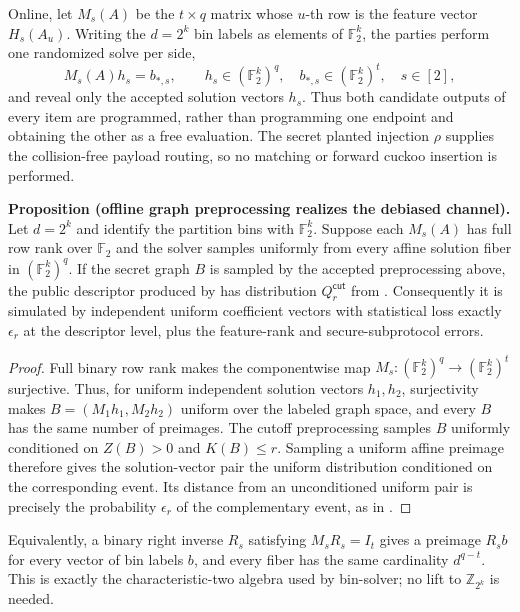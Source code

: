 Online, let $M_s(A)$ be the $t\times q$ matrix whose $u$-th row is the
feature vector $H_s(A_u)$.  Writing the $d=2^k$ bin labels as elements of
$\mathbb F_2^k$, the parties perform one randomized solve per side,
\begin{equation}\label{eq:rev-cuckoo-offline-graph-solve}
 M_s(A)h_s=b_{*,s},\qquad
 h_s\in(\mathbb F_2^k)^q,\quad b_{*,s}\in(\mathbb F_2^k)^t,\quad s\in[2],
\end{equation}
and reveal only the accepted solution vectors $h_s$.  Thus both candidate
outputs of every item are programmed, rather than programming one endpoint
and obtaining the other as a free evaluation.  The secret planted injection
$\rho$ supplies the collision-free payload routing, so no matching or forward
cuckoo insertion is performed.

\medskip
\noindent\textbf{Proposition (offline graph preprocessing realizes the
debiased channel).}
Let $d=2^k$ and identify the partition bins with $\mathbb F_2^k$.  Suppose
each $M_s(A)$ has full row rank over $\mathbb F_2$ and the solver samples
uniformly from every affine solution fiber in $(\mathbb F_2^k)^q$.  If the secret graph $B$ is
sampled by the accepted preprocessing above, the public descriptor produced
by  has distribution
$Q_r^{\mathsf{cut}}$ from
.  Consequently it is
simulated by independent uniform coefficient vectors with statistical loss
exactly $\epsilon_r$ at the descriptor level, plus the feature-rank and
secure-subprotocol errors.

\begin{proof}
Full binary row rank makes the componentwise map
$M_s:(\mathbb F_2^k)^q\to(\mathbb F_2^k)^t$ surjective.  Thus, for uniform
independent solution vectors $h_1,h_2$, surjectivity makes
$B=(M_1h_1,M_2h_2)$ uniform over the labeled graph space, and every $B$ has
the same number of preimages.  The cutoff preprocessing samples $B$ uniformly
conditioned on $Z(B)>0$ and $K(B)\leq r$.  Sampling a uniform affine preimage
therefore gives the solution-vector pair the uniform distribution conditioned
on the corresponding event.  Its distance from an unconditioned uniform pair
is precisely the probability $\epsilon_r$ of the complementary event, as in
.
\end{proof}

Equivalently, a binary right inverse $R_s$ satisfying $M_sR_s=I_t$ gives a
preimage $R_sb$ for every vector of bin labels $b$, and every fiber has the
same cardinality $d^{q-t}$.  This is exactly the characteristic-two algebra
used by \textsf{bin-solver}; no lift to $\mathbb Z_{2^k}$ is needed.

